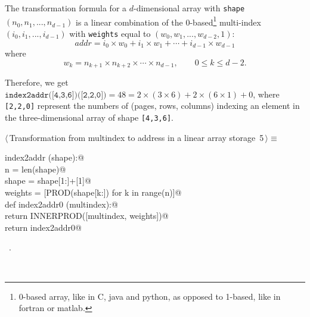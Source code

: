 \documentclass[11pt,oneside]{article}	%
\begin{document}
The transformation formula for a $d$-dimensional array with \texttt{shape} $(n_0,n_1,...,n_{d-1})$ is a linear combination of the 0-based\footnote{0-based array, like in C, java and python, as opposed to 1-based, like in fortran or matlab.} multi-index $(i_0,i_1,...,i_{d-1})$ with \texttt{weights} equal to $(w_0,w_1,...,w_{d-2},1)$:
\[
addr = i_0\times w_0 +i_1\times w_1 +\cdots +i_{d-1}\times w_{d-1}
\]
where 
\[
w_k = n_{k+1} \times n_{k+2} \times\cdots\times  n_{d-1}, \qquad 0\leq k\leq d-2.
\]

Therefore, we get $\texttt{index2addr([4,3,6])([2,2,0])}=48= 2\times(3\times 6)+2\times(6\times 1)+0$,
where \texttt{[2,2,0]} represent the numbers of (pages, rows, columns) indexing an element in the three-dimensional array of shape \texttt{[4,3,6]}.

\begin{flushleft} \small
\begin{minipage}{\linewidth} \label{scrap6}
\protect{}$\langle\,$Transformation from multindex to address in a linear array storage\nobreak\ {\footnotesize 5}$\,\rangle\equiv$
\vspace{-1ex}
\begin{list}{}{} \item
\mbox{}\verb@def index2addr (shape):@\\
\mbox{}\verb@    n = len(shape)@\\
\mbox{}\verb@    shape = shape[1:]+[1]@\\
\mbox{}\verb@    weights = [PROD(shape[k:]) for k in range(n)]@\\
\mbox{}\verb@    def index2addr0 (multindex):@\\
\mbox{}\verb@        return INNERPROD([multindex, weights])@\\
\mbox{}\verb@    return index2addr0@\\
\mbox{}\verb@@{\NWsep}
\end{list}
\vspace{-1ex}
\footnotesize\addtolength{\baselineskip}{-1ex}
\begin{list}{}{\setlength{\itemsep}{-\parsep}\setlength{\itemindent}{-\leftmargin}}
\item \NWtxtMacroRefIn\ .
\end{list}
\end{minipage}\\[4ex]
\end{flushleft}
\end{document}
